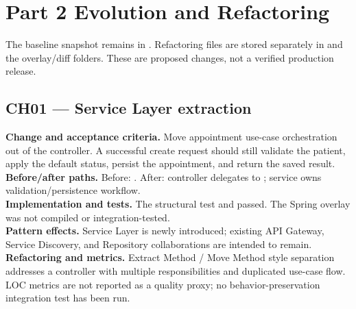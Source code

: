 \documentclass[11pt,a4paper]{article}
\begin{document}
\section{Part 2 Evolution and Refactoring}
The baseline snapshot remains in . Refactoring files are stored separately in  and the overlay/diff folders. These are proposed changes, not a verified production release.

\subsection{CH01 — Service Layer extraction}
\textbf{Change and acceptance criteria.} Move appointment use-case orchestration out of the controller. A successful create request should still validate the patient, apply the default status, persist the appointment, and return the saved result.\\
\textbf{Before/after paths.} Before: . After: controller delegates to ; service owns validation/persistence workflow.\\
\textbf{Implementation and tests.} The structural test  and  passed. The Spring overlay was not compiled or integration-tested.\\
\textbf{Pattern effects.} Service Layer is newly introduced; existing API Gateway, Service Discovery, and Repository collaborations are intended to remain.\\
\textbf{Refactoring and metrics.} Extract Method / Move Method style separation addresses a controller with multiple responsibilities and duplicated use-case flow. LOC metrics are not reported as a quality proxy; no behavior-preservation integration test has been run.
\end{document}
